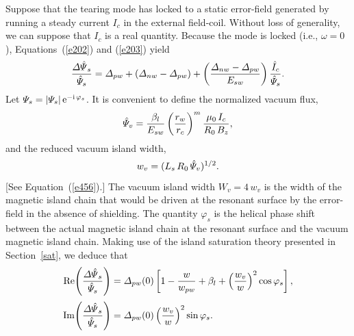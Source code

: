 \documentclass[notitlepage,12pt]{article}
\begin{document}
Suppose that the
tearing mode has locked to a static error-field generated by running a steady current $I_c$ in the external field-coil. Without loss of
generality, we can suppose that $I_c$ is a real quantity. 
Because
the mode is locked (i.e., $\omega=0$), Equations~(\ref{e202}) and (\ref{e203}) yield
\begin{equation}
\frac{{\mit\Delta\hat{\Psi}}_s}{\hat{\mit\Psi}_s} = {\mit\Delta}_{pw} + ({\mit\Delta}_{nw}-{\mit\Delta}_{pw}) +
\left(\frac{{\mit\Delta}_{nw} - {\mit\Delta}_{pw}}{E_{sw}}\right)\frac{\hat{I}_c}{\hat{\mit\Psi}_s}.
\end{equation}
Let ${\mit\Psi}_s = |{\mit\Psi}_s|\,{\rm e}^{-{\rm i}\,\varphi_s}$. It is convenient to define the normalized vacuum
flux,
\begin{equation}
\hat{\mit\Psi}_v = \frac{\beta_l}{E_{sw}}\left(\frac{r_w}{r_c}\right)^m\frac{\mu_0\,I_c}{R_0\,B_z},
\end{equation}
and the reduced vacuum island width,
\begin{equation}
w_v = (L_s\,R_0\,\hat{\mit\Psi}_v)^{1/2}.
\end{equation}
[See Equation~(\ref{e456}).] The vacuum island width $W_v = 4\,w_v$ is the width of the magnetic island chain that
would be driven at the resonant surface by the error-field in the absence of shielding. The quantity $\varphi_s$ is the
helical phase shift between the actual magnetic island chain  at the resonant surface and the vacuum magnetic island
chain. Making use of the island saturation theory presented in Section~\ref{sat}, we deduce that
\begin{align}
{\rm Re}\!\left(\frac{{\mit\Delta\hat{\Psi}}_s}{\hat{\mit\Psi}_s}\right)&= {\mit\Delta}_{pw}(0)\left[1-\frac{w}{w_{pw}}
+\beta_l + \left(\frac{w_v}{w}\right)^2\cos\varphi_s\right],\\[0.5ex]
{\rm Im}\!\left(\frac{{\mit\Delta\hat{\Psi}}_s}{\hat{\mit\Psi}_s}\right)&={\mit\Delta}_{pw}(0)\left(\frac{w_v}{w}\right)^2\sin\varphi_s.
\end{align}
\end{document}
